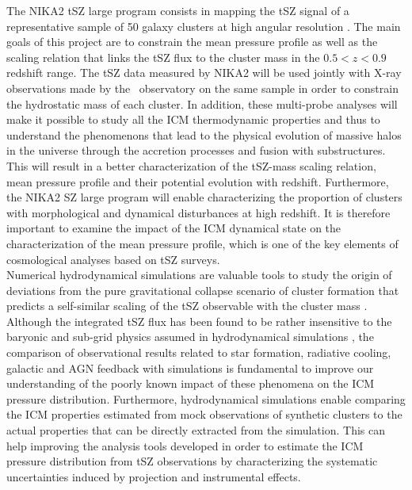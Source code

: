 \documentclass[twocolumn,traditabstract]{aa}
\begin{document}
\indent The NIKA2 tSZ large program consists in mapping the tSZ signal of a representative sample of 50 galaxy clusters at high angular resolution \citep{com16}. The main goals of this project are to constrain the mean pressure profile as well as the scaling relation that links the tSZ flux to the cluster mass in the $0.5 < z < 0.9$ redshift range. The tSZ data measured by NIKA2 will be used jointly with X-ray observations made by the \xmm\ observatory on the same sample in order to constrain the hydrostatic mass of each cluster. In addition, these multi-probe analyses will make it possible to study all the ICM thermodynamic properties and thus to understand the phenomenons that lead to the physical evolution of massive halos in the universe through the accretion processes and fusion with substructures. This will result in a better characterization of the tSZ-mass scaling relation, mean pressure profile and their potential evolution with redshift. Furthermore, the NIKA2 SZ large program will enable characterizing the proportion of clusters with morphological and dynamical disturbances at high redshift. It is therefore important to examine the impact of the ICM dynamical state on the characterization of the mean pressure profile, which is one of the key elements of cosmological analyses based on tSZ surveys.\\
\indent Numerical hydrodynamical simulations are valuable tools to study the origin of deviations from the pure gravitational collapse scenario of cluster formation that predicts a self-similar scaling of the tSZ observable with the cluster mass \citep[see][for a review]{bor11}. Although the integrated tSZ flux has been found to be rather insensitive to the baryonic and sub-grid physics assumed in hydrodynamical simulations \citep[\emph{e.g.}][]{sha08}, the comparison of observational results related to star formation, radiative cooling, galactic and AGN feedback with simulations is fundamental to improve our understanding of the poorly known impact of these phenomena on the ICM pressure distribution. Furthermore, hydrodynamical simulations enable comparing the ICM properties estimated from mock observations of synthetic clusters to the actual properties that can be directly extracted from the simulation. This can help improving the analysis tools developed in order to estimate the ICM pressure distribution from tSZ observations by characterizing the systematic uncertainties induced by projection and instrumental effects.\\
\end{document}
